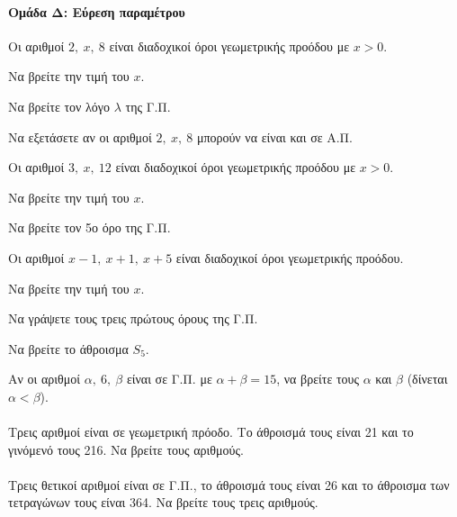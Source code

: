 \documentclass[11pt,a4paper,modern]{FFExercises}
\begin{document}

\paragraph{Ομάδα Δ: Εύρεση παραμέτρου}

\askhsh
Οι αριθμοί $2,\ x,\ 8$ είναι διαδοχικοί όροι γεωμετρικής προόδου με $x > 0$.
\begin{alist}
  \item Να βρείτε την τιμή του $x$.
  \item Να βρείτε τον λόγο $\lambda$ της Γ.Π.
  \item Να εξετάσετε αν οι αριθμοί $2,\ x,\ 8$ μπορούν να είναι και σε Α.Π.
\end{alist}

\askhsh
Οι αριθμοί $3,\ x,\ 12$ είναι διαδοχικοί όροι γεωμετρικής προόδου με $x > 0$.
\begin{alist}
  \item Να βρείτε την τιμή του $x$.
  \item Να βρείτε τον 5ο όρο της Γ.Π.
\end{alist}

\askhsh
Οι αριθμοί $x-1,\ x+1,\ x+5$ είναι διαδοχικοί όροι γεωμετρικής προόδου.
\begin{alist}
  \item Να βρείτε την τιμή του $x$.
  \item Να γράψετε τους τρεις πρώτους όρους της Γ.Π.
  \item Να βρείτε το άθροισμα $S_5$.
\end{alist}

\askhsh
Αν οι αριθμοί $\alpha,\ 6,\ \beta$ είναι σε Γ.Π. με $\alpha + \beta = 15$, να βρείτε τους $\alpha$ και $\beta$ (δίνεται $\alpha < \beta$).\\\\

\askhsh
Τρεις αριθμοί είναι σε γεωμετρική πρόοδο. Το άθροισμά τους είναι 21 και το γινόμενό τους 216. Να βρείτε τους αριθμούς.\\\\

\askhsh
Τρεις θετικοί αριθμοί είναι σε Γ.Π., το άθροισμά τους είναι 26 και το άθροισμα των τετραγώνων τους είναι 364. Να βρείτε τους τρεις αριθμούς.\\\\
\end{document}
